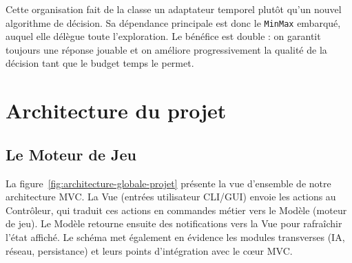 \documentclass[a4paper]{article}
\begin{document}
Cette organisation fait de la classe un adaptateur temporel plutôt qu'un nouvel algorithme de décision. Sa dépendance principale est donc le \texttt{MinMax} embarqué, auquel elle délègue toute l'exploration. Le bénéfice est double : on garantit toujours une réponse jouable et on améliore progressivement la qualité de la décision tant que le budget temps le permet.

\section{Architecture du projet}

\subsection{Le Moteur de Jeu}

La figure~\ref{fig:architecture-globale-projet} présente la vue d'ensemble de notre architecture MVC. La 
Vue (entrées utilisateur CLI/GUI) envoie les actions au Contrôleur, qui traduit 
ces actions en commandes métier vers le Modèle (moteur de jeu). Le Modèle 
retourne ensuite des notifications vers la Vue pour rafraîchir l'état affiché. 
Le schéma met également en évidence les modules transverses (IA, réseau, 
persistance) et leurs points d'intégration avec le cœur MVC.

\end{document}
